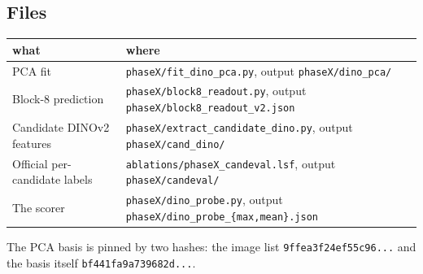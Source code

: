 \documentclass[11pt]{article}
\begin{document}
\subsection*{Files}

\begin{table}[h]
\centering
\begin{tabular}{@{}ll@{}}
\toprule
what & where \\
\midrule
PCA fit & \texttt{phaseX/fit\_dino\_pca.py}, output \texttt{phaseX/dino\_pca/} \\
Block-8 prediction & \texttt{phaseX/block8\_readout.py}, output \texttt{phaseX/block8\_readout\_v2.json} \\
Candidate DINOv2 features & \texttt{phaseX/extract\_candidate\_dino.py}, output \texttt{phaseX/cand\_dino/} \\
Official per-candidate labels & \texttt{ablations/phaseX\_candeval.lsf}, output \texttt{phaseX/candeval/} \\
The scorer & \texttt{phaseX/dino\_probe.py}, output \texttt{phaseX/dino\_probe\_\{max,mean\}.json} \\
\bottomrule
\end{tabular}
\end{table}

\noindent
The PCA basis is pinned by two hashes: the image list \texttt{9ffea3f24ef55c96...} and the basis
itself \texttt{bf441fa9a739682d...}.
\end{document}

